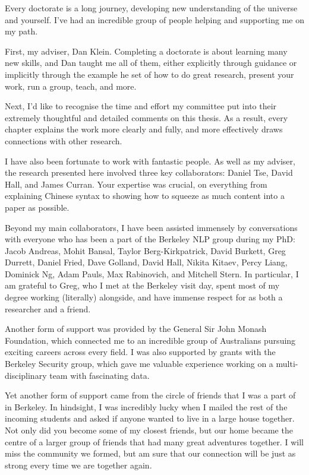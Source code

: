 \begin{acknowledgements}

Every doctorate is a long journey, developing new understanding of the universe and yourself.
I've had an incredible group of people helping and supporting me on my path.

First, my adviser, Dan Klein.
Completing a doctorate is about learning many new skills, and Dan taught me all of them, either explicitly through guidance or implicitly through the example he set of how to do great research, present your work, run a group, teach, and more.

Next, I'd like to recognise the time and effort my committee put into their extremely thoughtful and detailed comments on this thesis.
As a result, every chapter explains the work more clearly and fully, and more effectively draws connections with other research.

I have also been fortunate to work with fantastic people.
As well as my adviser, the research presented here involved three key collaborators: Daniel Tse, David Hall, and James Curran.
Your expertise was crucial, on everything from explaining Chinese syntax to showing how to squeeze as much content into a paper as possible.

Beyond my main collaborators, I have been assisted immensely by conversations with everyone who has been a part of the Berkeley NLP group during my PhD:
Jacob Andreas, Mohit Bansal, Taylor Berg-Kirkpatrick, David Burkett, Greg Durrett, Daniel Fried, Dave Golland, David Hall, Nikita Kitaev, Percy Liang, Dominick Ng, Adam Pauls, Max Rabinovich, and Mitchell Stern.
In particular, I am grateful to Greg, who I met at the Berkeley visit day, spent most of my degree working (literally) alongside, and have immense respect for as both a researcher and a friend.

Another form of support was provided by the General Sir John Monash Foundation, which connected me to an incredible group of Australians pursuing exciting careers across every field.
I was also supported by grants with the Berkeley Security group, which gave me valuable experience working on a multi-disciplinary team with fascinating data.

Yet another form of support came from the circle of friends that I was a part of in Berkeley.
In hindsight, I was incredibly lucky when I mailed the rest of the incoming students and asked if anyone wanted to live in a large house together.
Not only did you become some of my closest friends, but our home became the centre of a larger group of friends that had many great adventures together.
I will miss the community we formed, but am sure that our connection will be just as strong every time we are together again.


\end{acknowledgements}
